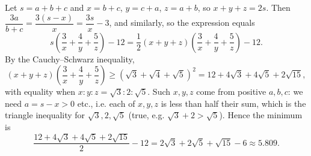 Let $s=a+b+c$ and $x=b+c$, $y=c+a$, $z=a+b$, so $x+y+z=2s$. Then $\dfrac{3a}{b+c}=\dfrac{3(s-x)}{x}=\dfrac{3s}{x}-3$, and similarly, so the expression equals
\[
s\left(\dfrac{3}{x}+\dfrac{4}{y}+\dfrac{5}{z}\right)-12=\dfrac{1}{2}(x+y+z)\left(\dfrac{3}{x}+\dfrac{4}{y}+\dfrac{5}{z}\right)-12 .
\]
By the Cauchy--Schwarz inequality,
\[
(x+y+z)\left(\dfrac{3}{x}+\dfrac{4}{y}+\dfrac{5}{z}\right)\ge\left(\sqrt3+\sqrt4+\sqrt5\right)^2=12+4\sqrt3+4\sqrt5+2\sqrt{15},
\]
with equality when $x:y:z=\sqrt3:2:\sqrt5$. Such $x,y,z$ come from positive $a,b,c$: we need $a=s-x>0$ etc., i.e. each of $x,y,z$ is less than half their sum, which is the triangle inequality for $\sqrt3,2,\sqrt5$ (true, e.g. $\sqrt3+2>\sqrt5$). Hence the minimum is
\[
\dfrac{12+4\sqrt3+4\sqrt5+2\sqrt{15}}{2}-12=\boxed{2\sqrt3+2\sqrt5+\sqrt{15}-6}\approx5.809 .
\]
